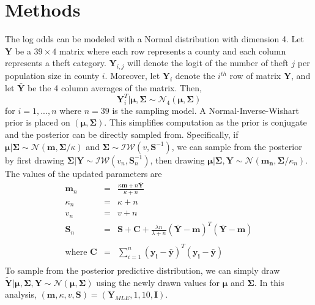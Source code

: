 \documentclass{../../tex_template/asaproc}
\newcommand{\Y}{ \bm Y }
\newcommand{\ds}{ \displaystyle }
\begin{document}
\section{Methods}
The log odds can be modeled with a Normal distribution with dimension 4.  Let
$\bm Y$ be a $39\times 4$ matrix where each row represents a county and each
column represents a theft category. $\bm Y_{i,j}$ will denote the logit of the
number of theft $j$ per population size in county $i$. Moreover, let $\bm Y_i$
denote the $i^{th}$ row of matrix $\bm Y$, and let $\bar{\bm Y}$ be the 4
column averages of the matrix.  Then,
\[
  \Y_i^T | \bm{\mu,\Sigma} \sim \mathcal{N}_4(\bm{\mu,\Sigma})
\]
for $i=1,...,n$ where $n=39$ is the sampling model. A Normal-Inverse-Wishart prior is
placed on $(\bm{\mu,\Sigma})$. This simplifies computation as the prior is
conjugate and the posterior can be directly sampled from. Specifically, if
$\bm\mu | \bm\Sigma \sim \mathcal{N}(\bm{m,\Sigma}/\kappa)$ and $\bm \Sigma
\sim \mathcal{IW}(v,\bm S^{-1})$, we can sample from the posterior by
first drawing $\bm \Sigma | \bm Y \sim \mathcal{IW}(v_n,\bm S_n^{-1})$, then 
drawing $\bm{\mu | \Sigma, Y} \sim \mathcal{N}(\bm{m_n,\Sigma}/\kappa_n)$.
The values of the updated parameters are
\[
\begin{array}{rcl}
  \bm m_n &=& \ds\frac{\kappa\bm m + n\bar{\bm Y}}{\kappa+n} \\
  \kappa_n &=& \kappa + n \\
  v_n &=& v + n \\
  \bm S_n &=& \bm{S + C} + \ds\frac{\lambda n}{\lambda+n} 
  (\boldsymbol{\bm{\bar{Y}-m}})^T(\boldsymbol{\bm{\bar{Y}-m}}) \\
  \\
  \text{where } \boldsymbol{C} &=& \sum_{i=1}^{n} (\boldsymbol{y_i-\bar{y}})^T(\boldsymbol{y_i-\bar{y}}) \\
\end{array}
\]
To sample from the posterior predictive distribution, we can simply draw
$\tilde{\bm Y} | \bm{\mu,\Sigma,Y} \sim \mathcal{N}(\bm{\mu,\Sigma})$ using the
newly drawn values for $\bm\mu$ and $\bm\Sigma$. In this analysis, $(\bm m,
\kappa, v, \bm S) = (\bm Y_{MLE},1,10, \bm I)$.
\end{document}
